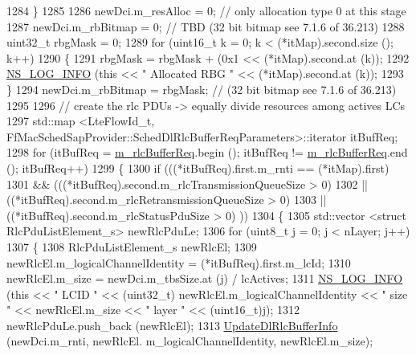 \begin{DoxyCode}
1284         \}
1285 
1286       newDci.m\_resAlloc = 0;  \textcolor{comment}{// only allocation type 0 at this stage}
1287       newDci.m\_rbBitmap = 0; \textcolor{comment}{// TBD (32 bit bitmap see 7.1.6 of 36.213)}
1288       uint32\_t rbgMask = 0;
1289       \textcolor{keywordflow}{for} (uint16\_t k = 0; k < (*itMap).second.size (); k++)
1290         \{
1291           rbgMask = rbgMask + (0x1 << (*itMap).second.at (k));
1292           \hyperlink{group__logging_gafbd73ee2cf9f26b319f49086d8e860fb}{NS\_LOG\_INFO} (\textcolor{keyword}{this} << \textcolor{stringliteral}{" Allocated RBG "} << (*itMap).second.at (k));
1293         \}
1294       newDci.m\_rbBitmap = rbgMask; \textcolor{comment}{// (32 bit bitmap see 7.1.6 of 36.213)}
1295 
1296       \textcolor{comment}{// create the rlc PDUs -> equally divide resources among actives LCs}
1297       std::map <LteFlowId\_t, FfMacSchedSapProvider::SchedDlRlcBufferReqParameters>::iterator itBufReq;
1298       \textcolor{keywordflow}{for} (itBufReq = \hyperlink{classns3_1_1TdTbfqFfMacScheduler_af1c1db8b8201f905faf17ce03f0369db}{m\_rlcBufferReq}.begin (); itBufReq != 
      \hyperlink{classns3_1_1TdTbfqFfMacScheduler_af1c1db8b8201f905faf17ce03f0369db}{m\_rlcBufferReq}.end (); itBufReq++)
1299         \{
1300           \textcolor{keywordflow}{if} (((*itBufReq).first.m\_rnti == (*itMap).first)
1301               && (((*itBufReq).second.m\_rlcTransmissionQueueSize > 0)
1302                   || ((*itBufReq).second.m\_rlcRetransmissionQueueSize > 0)
1303                   || ((*itBufReq).second.m\_rlcStatusPduSize > 0) ))
1304             \{
1305               std::vector <struct RlcPduListElement\_s> newRlcPduLe;
1306               \textcolor{keywordflow}{for} (uint8\_t j = 0; j < nLayer; j++)
1307                 \{
1308                   RlcPduListElement\_s newRlcEl;
1309                   newRlcEl.m\_logicalChannelIdentity = (*itBufReq).first.m\_lcId;
1310                   newRlcEl.m\_size = newDci.m\_tbsSize.at (j) / lcActives;
1311                   \hyperlink{group__logging_gafbd73ee2cf9f26b319f49086d8e860fb}{NS\_LOG\_INFO} (\textcolor{keyword}{this} << \textcolor{stringliteral}{" LCID "} << (uint32\_t) newRlcEl.m\_logicalChannelIdentity 
      << \textcolor{stringliteral}{" size "} << newRlcEl.m\_size << \textcolor{stringliteral}{" layer "} << (uint16\_t)j);
1312                   newRlcPduLe.push\_back (newRlcEl);
1313                   \hyperlink{classns3_1_1TdTbfqFfMacScheduler_a268d99954f7c5e69294a43b82671dcf9}{UpdateDlRlcBufferInfo} (newDci.m\_rnti, newRlcEl.
      m\_logicalChannelIdentity, newRlcEl.m\_size);

\end{DoxyCode}
